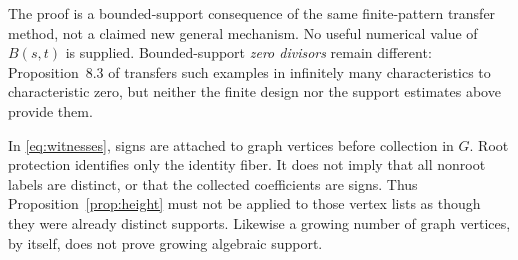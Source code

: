 The proof is a bounded-support consequence of the same finite-pattern transfer method, not a claimed new general mechanism. No useful numerical value of $B(s,t)$ is supplied. Bounded-support \emph{zero divisors} remain different: Proposition~8.3 of \cite{MD26} transfers such examples in infinitely many characteristics to characteristic zero, but neither the finite design nor the support estimates above provide them.

In \eqref{eq:witnesses}, signs are attached to graph vertices before collection in $G$. Root protection identifies only the identity fiber. It does not imply that all nonroot labels are distinct, or that the collected coefficients are signs. Thus Proposition~\ref{prop:height} must not be applied to those vertex lists as though they were already distinct supports. Likewise a growing number of graph vertices, by itself, does not prove growing algebraic support.

